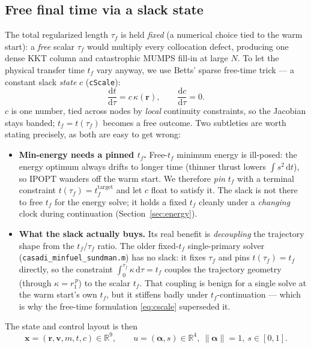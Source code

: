 \documentclass[11pt]{article}
\newcommand{\code}[1]{\texttt{\small #1}}
\newcommand{\file}[1]{\texttt{\small #1}}
\newcommand{\rv}{\mathbf{r}}
\newcommand{\vv}{\mathbf{v}}
\newcommand{\uv}{\boldsymbol{\alpha}}
\newcommand{\dd}[2]{\frac{\mathrm{d}#1}{\mathrm{d}#2}}
\newcommand{\rE}{r_1}
\begin{document}
\subsection{Free final time via a slack state}\label{sec:sundman-cscale}
The total regularized length $\tau_f$ is held \emph{fixed} (a numerical choice
tied to the warm start): a \emph{free} scalar $\tau_f$ would multiply every
collocation defect, producing one dense KKT column and catastrophic MUMPS
fill-in at large $N$. To let the physical transfer time $t_f$ vary anyway, we use
Betts' sparse free-time trick --- a constant slack \emph{state} $c$ (\code{cScale}):
\begin{equation}
  \dd{t}{\tau} = c\,\kappa(\rv),\qquad \dd{c}{\tau} = 0 .
  \label{eq:cscale}
\end{equation}
$c$ is one number, tied across nodes by \emph{local} continuity constraints, so
the Jacobian stays banded; $t_f=t(\tau_f)$ becomes a free outcome. Two subtleties
are worth stating precisely, as both are easy to get wrong:
\begin{itemize}
  \item \textbf{Min-energy needs a pinned $t_f$.} Free-$t_f$ minimum energy is
        ill-posed: the energy optimum always drifts to longer time (thinner
        thrust lowers $\int s^2\,\mathrm{d}t$), so IPOPT wanders off the warm
        start. We therefore \emph{pin} $t_f$ with a terminal constraint
        $t(\tau_f)=t_f^{\text{target}}$ and let $c$ float to satisfy it. The
        slack is not there to free $t_f$ for the energy solve; it holds a fixed
        $t_f$ cleanly under a \emph{changing} clock during continuation
        (Section~\ref{sec:energy}).
  \item \textbf{What the slack actually buys.} Its real benefit is
        \emph{decoupling} the trajectory shape from the $t_f/\tau_f$ ratio. The
        older fixed-$t_f$ single-primary solver
        (\file{casadi\_minfuel\_sundman.m}) has no slack: it fixes $\tau_f$ and
        pins $t(\tau_f)=t_f$ directly, so the constraint
        $\int_0^{\tau_f}\!\kappa\,\mathrm{d}\tau=t_f$ couples the trajectory
        geometry (through $\kappa=\rE^{\,p}$) to the scalar $t_f$. That coupling
        is benign for a single solve at the warm start's own $t_f$, but it
        stiffens badly under $t_f$-continuation --- which is why the free-time
        formulation \eqref{eq:cscale} superseded it.
\end{itemize}
The state and control layout is then
\begin{equation}
  \mathbf{x} = (\rv,\vv,m,t,c)\in\mathbb{R}^9,\qquad
  u = (\uv,s)\in\mathbb{R}^4,\ \lVert\uv\rVert=1,\ s\in[0,1].
\end{equation}
\end{document}
